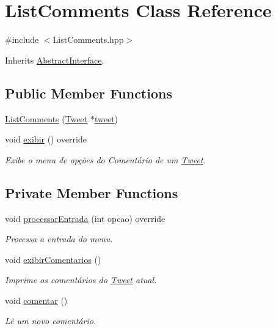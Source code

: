 \hypertarget{class_list_comments}{}\section{List\+Comments Class Reference}
\label{class_list_comments}


{\ttfamily \#include $<$List\+Comments.\+hpp$>$}



Inherits \hyperlink{class_abstract_interface}{Abstract\+Interface}.

\subsection*{Public Member Functions}
\begin{DoxyCompactItemize}
\item 
\hyperlink{class_list_comments_a5d9da26fbb0dc3eb6cee9ff129b28e27}{List\+Comments} (\hyperlink{class_tweet}{Tweet} $\ast$\hyperlink{class_list_comments_a415809885eccf4beabda6a346a797d7c}{tweet})
\item 
void \hyperlink{class_list_comments_ae1944d4065ee2d2954ee8cdefc17a2bf}{exibir} () override
\begin{DoxyCompactList}\small\item\em Exibe o menu de opções do Comentário de um \hyperlink{class_tweet}{Tweet}. \end{DoxyCompactList}\end{DoxyCompactItemize}
\subsection*{Private Member Functions}
\begin{DoxyCompactItemize}
\item 
void \hyperlink{class_list_comments_a5f1742eb60e1fb9977bab791c3b8a672}{processar\+Entrada} (int opcao) override
\begin{DoxyCompactList}\small\item\em Processa a entrada do menu. \end{DoxyCompactList}\item 
void \hyperlink{class_list_comments_a90342b6dce4d59f785788163524284a4}{exibir\+Comentarios} ()
\begin{DoxyCompactList}\small\item\em Imprime os comentários do \hyperlink{class_tweet}{Tweet} atual. \end{DoxyCompactList}\item 
void \hyperlink{class_list_comments_a43ac4c1f520ca659b45cbc83c2157c69}{comentar} ()
\begin{DoxyCompactList}\small\item\em Lê um novo comentário. \end{DoxyCompactList}\end{DoxyCompactItemize}
